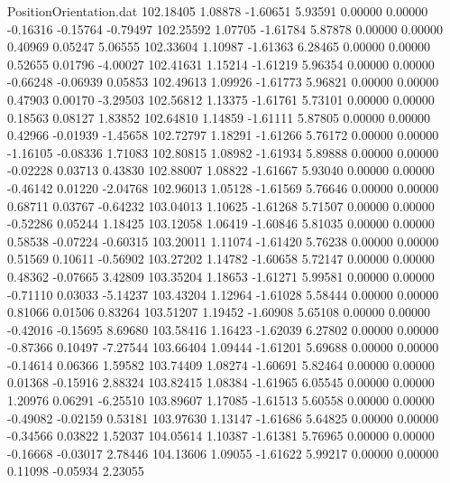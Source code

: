 \begin{filecontents}{PositionOrientation.dat}
 102.18405    1.08878   -1.60651     5.93591    0.00000    0.00000   -0.16316   -0.15764   -0.79497
 102.25592    1.07705   -1.61784     5.87878    0.00000    0.00000    0.40969    0.05247    5.06555
 102.33604    1.10987   -1.61363     6.28465    0.00000    0.00000    0.52655    0.01796   -4.00027
 102.41631    1.15214   -1.61219     5.96354    0.00000    0.00000   -0.66248   -0.06939    0.05853
 102.49613    1.09926   -1.61773     5.96821    0.00000    0.00000    0.47903    0.00170   -3.29503
 102.56812    1.13375   -1.61761     5.73101    0.00000    0.00000    0.18563    0.08127    1.83852
 102.64810    1.14859   -1.61111     5.87805    0.00000    0.00000    0.42966   -0.01939   -1.45658
 102.72797    1.18291   -1.61266     5.76172    0.00000    0.00000   -1.16105   -0.08336    1.71083
 102.80815    1.08982   -1.61934     5.89888    0.00000    0.00000   -0.02228    0.03713    0.43830
 102.88007    1.08822   -1.61667     5.93040    0.00000    0.00000   -0.46142    0.01220   -2.04768
 102.96013    1.05128   -1.61569     5.76646    0.00000    0.00000    0.68711    0.03767   -0.64232
 103.04013    1.10625   -1.61268     5.71507    0.00000    0.00000   -0.52286    0.05244    1.18425
 103.12058    1.06419   -1.60846     5.81035    0.00000    0.00000    0.58538   -0.07224   -0.60315
 103.20011    1.11074   -1.61420     5.76238    0.00000    0.00000    0.51569    0.10611   -0.56902
 103.27202    1.14782   -1.60658     5.72147    0.00000    0.00000    0.48362   -0.07665    3.42809
 103.35204    1.18653   -1.61271     5.99581    0.00000    0.00000   -0.71110    0.03033   -5.14237
 103.43204    1.12964   -1.61028     5.58444    0.00000    0.00000    0.81066    0.01506    0.83264
 103.51207    1.19452   -1.60908     5.65108    0.00000    0.00000   -0.42016   -0.15695    8.69680
 103.58416    1.16423   -1.62039     6.27802    0.00000    0.00000   -0.87366    0.10497   -7.27544
 103.66404    1.09444   -1.61201     5.69688    0.00000    0.00000   -0.14614    0.06366    1.59582
 103.74409    1.08274   -1.60691     5.82464    0.00000    0.00000    0.01368   -0.15916    2.88324
 103.82415    1.08384   -1.61965     6.05545    0.00000    0.00000    1.20976    0.06291   -6.25510
 103.89607    1.17085   -1.61513     5.60558    0.00000    0.00000   -0.49082   -0.02159    0.53181
 103.97630    1.13147   -1.61686     5.64825    0.00000    0.00000   -0.34566    0.03822    1.52037
 104.05614    1.10387   -1.61381     5.76965    0.00000    0.00000   -0.16668   -0.03017    2.78446
 104.13606    1.09055   -1.61622     5.99217    0.00000    0.00000    0.11098   -0.05934    2.23055

\end{filecontents}
